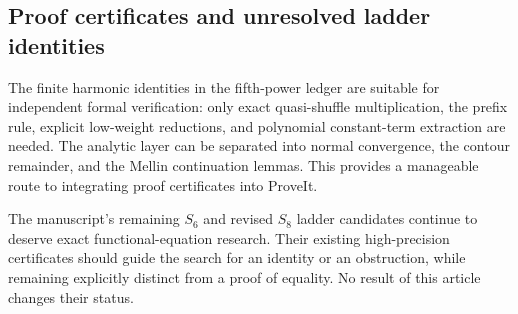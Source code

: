 \subsection{Proof certificates and unresolved ladder identities}

The finite harmonic identities in the fifth-power ledger are suitable
for independent formal verification: only exact quasi-shuffle
multiplication, the prefix rule, explicit low-weight reductions, and
polynomial constant-term extraction are needed. The analytic layer
can be separated into normal convergence, the contour remainder,
and the Mellin continuation lemmas. This provides a manageable route
to integrating proof certificates into ProveIt.

The manuscript's remaining $S_6$ and revised $S_8$ ladder candidates
continue to deserve exact functional-equation research. Their
existing high-precision certificates should guide the search for
an identity or an obstruction, while remaining explicitly distinct
from a proof of equality. No result of this article changes their
status.
